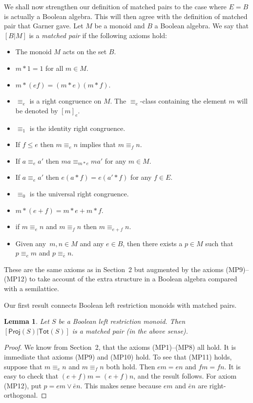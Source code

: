 \documentclass[a4paper]{amsart}
\newtheorem{lemma}[theorem]{Lemma}
\begin{document}
We shall now strengthen our definition of matched pairs to the case where $E = B$ is actually a Boolean algebra.
This will then agree with the definition of matched pair that Garner gave.
Let $M$ be a monoid and $B$ a Boolean algebra.
We say that $[B|M]$ is a {\em matched pair} if the following axioms hold:
\begin{itemize}
\item[{\rm (MP1).}] The monoid $M$ acts on the set $B$.
\item[{\rm (MP2).}] $m \ast 1 = 1$ for all $m \in M$.
\item[{\rm (MP3).}] $m \ast (ef) = (m \ast e)(m \ast f)$.
\item[{\rm (MP4).}] $\equiv_{e}$ is a right congruence on $M$. The $\equiv_{e}$-class containing the element $m$ will be denoted by $[m]_{e}$.
\item[{\rm (MP5).}] $\equiv_{1}$ is the identity right congruence.
\item[{\rm (MP6).}] If $f \leq e$ then $m \equiv_{e} n$ implies that $m \equiv_{f} n$.
\item[{\rm (MP7).}] If $a \equiv_{e} a'$ then $ma \equiv_{m \ast e} ma'$ for any $m \in M$.
\item[{\rm (MP8).}] If $a \equiv_{e} a'$ then $e(a \ast f) = e(a' \ast f)$ for any $f \in E$.
\item[{\rm (MP9).}] $\equiv_{0}$ is the universal right congruence.
\item[{\rm (MP10).}] $m \ast (e + f) = m \ast e + m \ast f$.
\item[{\rm (MP11).}] if $m \equiv_{e} n$ and $m \equiv_{f} n$ then $m \equiv_{e+f} n$. 
\item[{\rm (MP12).}] Given any\ $m,n \in M$ and any $e \in B$, then there exists a $p \in M$ such that $p \equiv_{e} m$ and $p \equiv_{\bar{e}} n$. 
\end{itemize}
These are the same axioms as in Section~2 but augmented by the axioms (MP9)--(MP12) to take account of the extra structure in a Boolean algebra
compared with a semilattice.


Our first result connects Boolean left restriction monoids with matched pairs.


\begin{lemma}\label{lem:anne} Let $S$ be a Boolean left restriction monoid.
Then $[\mathsf{Proj}(S)|\mathsf{Tot}(S)]$ is a matched pair (in the above sense).
\end{lemma}
\begin{proof} We know from Section~2, that the axioms (MP1)--(MP8) all hold.
It is immediate that axioms (MP9) and (MP10) hold.
To see that (MP11) holds, suppose that $m \equiv_{e} n$ and $m \equiv_{f} n$ both hold.
Then $em = en$ and $fm = fn$.
It is easy to check that $(e + f)m = (e + f)n$, and the result follows.
For axiom (MP12), put $p = em \vee \bar{e}n$.
This makes sense because $em$ and $\bar{e}n$ are right-orthogonal.
\end{proof}
\end{document}
